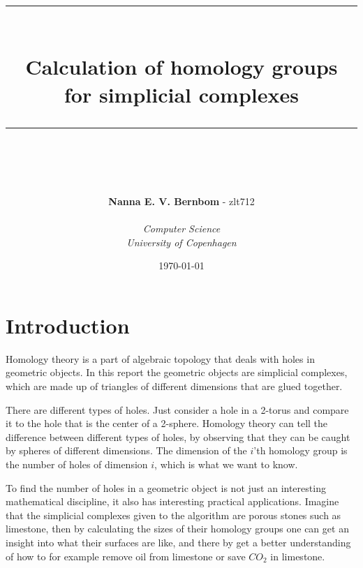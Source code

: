 \documentclass[11pt,a4paper,twoside]{report}
\newcommand{\HRule}{\rule{\linewidth}{0.5mm}}
\begin{document}
\lstset{language=python,frame=single,breaklines=true, title=\lstname}

\begin{titlepage}
\title{\HRule \\[0.4cm]
\textbf{Calculation of homology groups\\for simplicial complexes}\\
\HRule \\[0.4cm]}
\author{\textbf{Nanna E. V. Bernbom} - zlt712\\\\
\textit{Computer Science}\\
\textit{University of Copenhagen}}
\date{\today}

\maketitle
\thispagestyle{empty}
\end{titlepage}

\newpage
\tableofcontents
\newpage
\section*{Introduction}
Homology theory is a part of algebraic topology that deals with holes in geometric objects. In this report the geometric objects are simplicial complexes, which are made up of triangles of different dimensions that are glued together.

There are different types of holes. Just consider a hole in a 2-torus and compare it to the hole that is the center of a 2-sphere. Homology theory can tell the difference between different types of holes, by observing that they can be caught by spheres of different dimensions. The dimension of the $i$'th homology group is the number of holes of dimension $i$, which is what we want to know.

To find the number of holes in a geometric object is not just an interesting mathematical discipline, it also has interesting practical applications. Imagine that the simplicial complexes given to the algorithm are porous stones such as limestone, then by calculating the sizes of their homology groups one can get an insight into what their surfaces are like, and there by get a better understanding of how to for example remove oil from limestone or save $CO_2$ in limestone. 
\newpage
\end{document}
